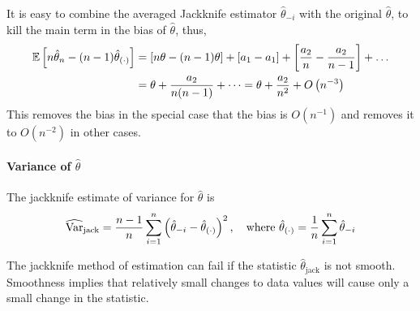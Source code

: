 \begin{remark}
	It is easy to combine the averaged Jackknife estimator \(\hat{\theta}_{-i}\) with the original \(\hat{\theta}\), to kill the main term in the bias of \(\hat{\theta}\), thus,
	\begin{equation*}
		\begin{aligned}
			\mathbb{E}\left[n\hat{\theta}_{n}-(n-1)\hat{\theta}_{(\cdot)}\right] & =\left[n\theta-(n-1)\theta\right]+\left[a_{1}-a_{1}\right]+\left[\frac{a_{2}}{n}-\frac{a_{2}}{n-1}\right]+\ldots \\
			                                                               & =\theta+\frac{a_{2}}{n(n-1)}+\cdots=\theta+\frac{a_{2}}{n^{2}}+O\left(n^{-3}\right)
		\end{aligned}
	\end{equation*}
	This removes the bias in the special case that the bias is \(O\left(n^{-1}\right)\) and removes it to \(O\left(n^{-2}\right)\) in other cases.
\end{remark}

\paragraph{Variance of \(\hat{\theta}\)}

The jackknife estimate of variance for \(\hat{\theta}\) is
\begin{equation}
	\widehat{\mathrm{Var}}_{\text{jack}}=\frac{n-1}{n}\sum_{i=1}^{n}\left(\hat{\theta}_{-i}-\hat{\theta}_{(\cdot)}\right)^{2},\quad\text{where }\hat{\theta}_{(\cdot)}=\frac{1}{n}\sum_{i=1}^{n}\hat{\theta}_{-i}
\end{equation}

The jackknife method of estimation can fail if the statistic \(\hat{\theta}_{\text{jack}}\) is not smooth. Smoothness
implies that relatively small changes to data values will cause only a small change in the
statistic.

\begin{example}

\end{example}

\begin{example}

\end{example}
